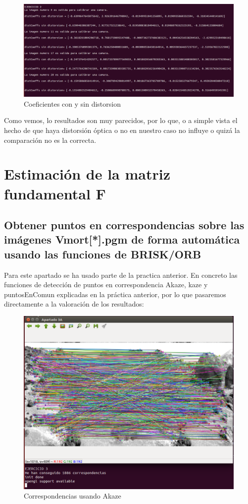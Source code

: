 \begin{figure}[H]
	\centering
	\includegraphics[width=0.9\linewidth]{diffcoefs}
	\caption{Coeficientes con y sin distorsion}
\end{figure}

Como vemos, lo resultados son muy parecidos, por lo que, o a simple vista el hecho de que haya distorsión óptica o no en nuestro caso no influye o quizá la comparación no es la correcta.

\section{Estimación de la matriz fundamental F}

\subsection{Obtener puntos en correspondencias sobre las imágenes Vmort[*].pgm de forma automática usando las funciones de BRISK/ORB}

Para este apartado se ha usado parte de la practica anterior. En concreto las funciones de detección de puntos en correspondencia Akaze, kaze y puntosEnComun explicadas en la práctica anterior, por lo que pasaremos directamente a la valoración de los resultados:

\begin{figure}[H]
	\centering
	\includegraphics[width=0.9\linewidth]{correspondencia}
	\caption{Correspondencias usando Akaze}
\end{figure}

